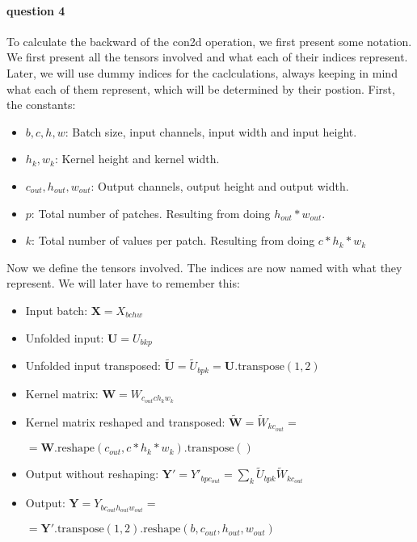 \documentclass{article}
\begin{document}
\paragraph{question 4} To calculate the backward of the con2d operation, we first present some notation. We first present all the tensors involved and what each of their indices represent. Later, we will use dummy indices for the caclculations, always keeping in mind what each of them represent, which will be determined by their postion. First, the constants:

\begin{itemize}
    \item \(b, c, h, w\): Batch size, input channels, input width and input height.
    \item \( h_k, w_k\): Kernel height and kernel width.
    \item \(c_{out}, h_{out}, w_{out}\): Output channels, output height and output width.
    \item \(p\): Total number of patches. Resulting from doing \(h_{out} * w_{out}\).
    \item \(k\): Total number of values per patch. Resulting from doing \(c * h_k * w_k\)
\end{itemize}

\noindent Now we define the tensors involved. The indices are now named with what they represent. We will later have to remember this:
\begin{itemize}
    \item Input batch: \(\mathbf{X} = X_{bchw}\)
    \item Unfolded input: \(\mathbf{U} = U_{bkp}\)
    \item Unfolded input transposed: \(\mathbf{\tilde{U}} = \tilde{U}_{bpk} = \textbf{U}.\text{transpose}(1, 2)\)
    \item Kernel matrix: \(\mathbf{W} = W_{c_{out}ch_kw_k}\)
    \item Kernel matrix reshaped and transposed: \(\mathbf{\tilde{W}} = \tilde{W}_{kc_{out}} = \)
    
    \( = \mathbf{W}.\text{reshape}(c_{out}, c * h_k * w_k).\text{transpose}()\)
    \item Output without reshaping: \(\mathbf{Y}' = Y'_{bpc_{out}} = \sum_k \tilde{U}_{bpk}\tilde{W}_{kc_{out}}\)
    \item Output: \(\mathbf{Y} = Y_{bc_{out}h_{out}w_{out}} = \)
    
    \( = \mathbf{Y}'.\text{transpose}(1, 2).\text{reshape}(b, c_{out}, h_{out}, w_{out})\)
\end{itemize} 
\end{document}
